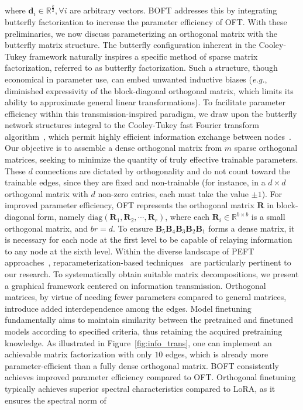 where $\bm{d}_i\in\mathbb{R}^{\frac{k}{2}},\forall i$ are arbitrary vectors. BOFT addresses this by integrating butterfly factorization to increase the parameter efficiency of OFT. With these preliminaries, we now discuss parameterizing an orthogonal matrix with the butterfly matrix structure. The butterfly configuration inherent in the Cooley-Tukey framework naturally inspires a specific method of sparse matrix factorization, referred to as butterfly factorization. Such a structure, though economical in parameter use, can embed unwanted inductive biases (\emph{e.g.}, diminished expressivity of the block-diagonal orthogonal matrix, which limits its ability to approximate general linear transformations). To facilitate parameter efficiency within this transmission-inspired paradigm, we draw upon the butterfly network structures integral to the Cooley-Tukey fast Fourier transform algorithm~\cite{cooley1965algorithm}, which permit highly efficient information exchange between nodes~\cite{klasing1994broadcasting}. Our objective is to assemble a dense orthogonal matrix from $m$ sparse orthogonal matrices, seeking to minimize the quantity of truly effective trainable parameters. These $d$ connections are dictated by orthogonality and do not count toward the trainable edges, since they are fixed and non-trainable (for instance, in a $d\times d$ orthogonal matrix with $d$ non-zero entries, each must take the value $\pm 1$). For improved parameter efficiency, OFT represents the orthogonal matrix $\bm{R}$ in block-diagonal form, namely $\text{diag}(\bm{R}_1,\bm{R}_2,\cdots,\bm{R}_r)$, where each $\bm{R}_i\in\mathbb{R}^{b\times b}$ is a small orthogonal matrix, and $br=d$. To ensure $\bm{B}_5\bm{B}_4\bm{B}_3\bm{B}_2\bm{B}_1$ forms a dense matrix, it is necessary for each node at the first level to be capable of relaying information to any node at the sixth level. Within the diverse landscape of PEFT approaches~\cite{houlsby2019parameter,aghajanyan2020intrinsic,hulora2022,edalati2022krona,wang2022adamix,gheini2021cross,zaken2022bitfit,guo2020parameter,sung2021training,ansell2022composable,lester2021power,li2021prefix,vu2022spot,he2021towards,mao2021unipelt,karimi2021compacter,liu2022few,sung2022lst,chen2022parameter,jia2022visual,chen2022adaptformer,zhang2022neural,jie2023fact,lian2022scaling,luo2023towards}, reparameterization-based techniques~\cite{aghajanyan2020intrinsic,hulora2022,edalati2022krona} are particularly pertinent to our research. To systematically obtain suitable matrix decompositions, we present a graphical framework centered on information transmission. Orthogonal matrices, by virtue of needing fewer parameters compared to general matrices, introduce added interdependence among the edges. Model finetuning fundamentally aims to maintain similarity between the pretrained and finetuned models according to specified criteria, thus retaining the acquired pretraining knowledge. As illustrated in Figure~\ref{fig:info_trans}, one can implement an achievable matrix factorization with only $10$ edges, which is already more parameter-efficient than a fully dense orthogonal matrix. BOFT consistently achieves improved parameter efficiency compared to OFT. Orthogonal finetuning typically achieves superior spectral characteristics compared to LoRA, as it ensures the spectral norm of 